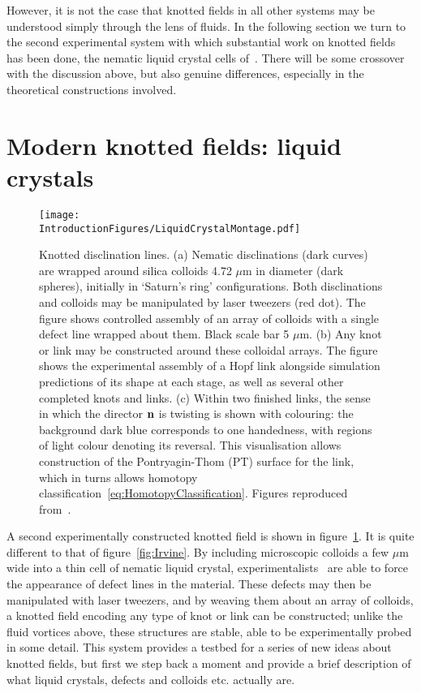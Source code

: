 However, it is not the case that knotted fields in all other systems may be understood simply through the lens of fluids. In the following section we turn to the second experimental system with which substantial work on knotted fields has been done, the nematic liquid crystal cells of~\citep{Tkalec2011,Tasinkevych2014,Copar2015}. There will be some crossover with the discussion above, but also genuine differences, especially in the theoretical constructions involved. 
\section{Modern knotted fields: liquid crystals}
\label{sec:LiquidCrystals}
\begin{figure}[htbp]
\centering
\texttt{[image: \\IntroductionFigures/LiquidCrystalMontage.pdf]}
\caption[Knotted disclination lines.]{Knotted disclination lines. (a) Nematic disclinations (dark curves) are wrapped around silica colloids 4.72 $\mu$m in diameter (dark spheres), initially in `Saturn's ring' configurations. Both disclinations and colloids may be manipulated by laser tweezers (red dot). The figure shows controlled assembly of an array of colloids with a single defect line wrapped about them. Black scale bar 5 $\mu$m. (b) Any knot or link may be constructed around these colloidal arrays. The figure shows the experimental assembly of a Hopf link alongside simulation predictions of its shape at each stage, as well as several other completed knots and links. (c) Within two finished links, the sense in which the director $\bf n$ is twisting is shown with colouring: the background dark blue corresponds to one handedness, with regions of light colour denoting its reversal. This visualisation allows construction of the Pontryagin-Thom (PT) surface for the link, which in turns allows homotopy classification~\eqref{eq:HomotopyClassification}. Figures reproduced from~\citep{Tkalec2011,Copar2015}.}
\label{fig:KnottedLiquidCrystal}
\end{figure}
A second experimentally constructed knotted field is shown in figure~\ref{fig:KnottedLiquidCrystal}. It is quite different to that of figure~\ref{fig:Irvine}. By including microscopic colloids a few $\mu$m wide into a thin cell of nematic liquid crystal, experimentalists~\citep{Tkalec2011,Tasinkevych2014,Copar2015} are able to force the appearance of defect lines in the material. These defects may then be manipulated with laser tweezers, and by weaving them about an array of colloids, a knotted field encoding any type of knot or link can be constructed; unlike the fluid vortices above, these structures are stable, able to be experimentally probed in some detail. This system provides a testbed for a series of new ideas about knotted fields, but first we step back a moment and provide a brief description of what liquid crystals, defects and colloids etc. actually are.

